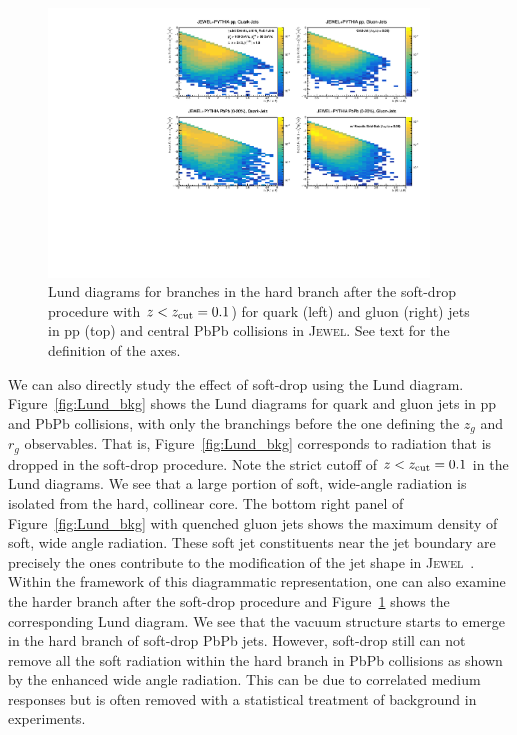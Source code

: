 \documentclass[notoc]{JHEP3}
\newcommand{\jw}{\textsc{Jewel}~}
\begin{document}
\begin{figure}[t]
	   \centering
	   \includegraphics[width=0.9\textwidth]{plots/Individual_LundDiagrams_zrel_hardBranch.pdf}
	   \caption{Lund diagrams for branches in the hard branch after the soft-drop procedure with $z<z_{\rm cut}=0.1$) for quark (left) and gluon (right) jets in pp (top) and central PbPb collisions in \textsc{Jewel}. See text for the definition of the axes.}
\label{fig:Lund_hard}
\end{figure}

We can also directly study the effect of soft-drop using the Lund diagram. Figure~\ref{fig:Lund_bkg} shows the Lund diagrams for quark and gluon jets in pp and PbPb collisions, with only the branchings before the one defining the $z_g$ and $r_g$ observables. That is, Figure~\ref{fig:Lund_bkg} corresponds to radiation that is dropped in the soft-drop procedure. Note the strict cutoff of $z < z_{\rm cut} = 0.1$ in the Lund diagrams. We see that a large portion of soft, wide-angle radiation is isolated from the hard, collinear core. The bottom right panel of Figure~\ref{fig:Lund_bkg} with quenched gluon jets shows the maximum density of soft, wide angle radiation. These soft jet constituents near the jet boundary are precisely the ones contribute to the modification of the jet shape in \jw \cite{KunnawalkamElayavalli:2017hxo}. Within the framework of this diagrammatic representation, one can also examine the harder branch after the soft-drop procedure and Figure~\ref{fig:Lund_hard} shows the corresponding Lund diagram. We see that the vacuum structure starts to emerge in the hard branch of soft-drop PbPb jets. However, soft-drop still can not remove all the soft radiation within the hard branch in PbPb collisions as shown by the enhanced wide angle radiation. This can be due to correlated medium responses but is often removed with a statistical treatment of background in experiments.
\end{document}
